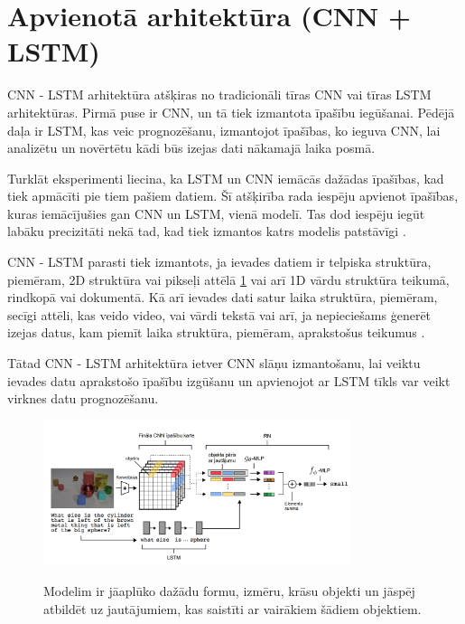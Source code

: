 \documentclass[12pt,paper=A4]{report}
\begin{document}
\section{Apvienotā arhitektūra (CNN + LSTM)}
CNN - LSTM arhitektūra atšķiras no tradicionāli tīras CNN vai tīras LSTM arhitektūras. Pirmā puse ir CNN, un tā tiek izmantota īpašību iegūšanai. Pēdējā daļa ir LSTM, kas veic prognozēšanu, izmantojot īpašības, ko ieguva CNN, lai analizētu un novērtētu kādi būs izejas dati nākamajā laika posmā.

Turklāt eksperimenti liecina, ka LSTM un CNN iemācās dažādas īpašības, kad tiek apmācīti pie tiem pašiem datiem. Šī atšķirība rada iespēju apvienot īpašības, kuras iemācījušies gan 
CNN un LSTM, vienā modelī. Tas dod iespēju iegūt labāku precizitāti nekā tad, kad tiek izmantos katrs modelis patstāvīgi \cite{geras2015blending}. 

 CNN - LSTM parasti tiek izmantots, ja ievades datiem ir telpiska struktūra, piemēram, 2D struktūra vai pikseļi attēlā \ref{cnnLstm} vai arī 1D vārdu struktūra teikumā, rindkopā vai dokumentā. Kā arī ievades dati satur laika struktūra, piemēram, secīgi attēli, kas veido video, vai vārdi tekstā vai arī, ja nepieciešams ģenerēt izejas datus, kam piemīt laika struktūra, piemēram, aprakstošus teikumus \cite{lstmCNNTut}. 
 
 Tātad CNN - LSTM arhitektūra ietver CNN slāņu izmantošanu, lai veiktu ievades datu aprakstošo īpašību izgūšanu un apvienojot ar LSTM tīkls var veikt virknes datu prognozēšanu.
 
 \begin{figure}[H] \centering
\includegraphics[width=0.80\textwidth]{cnnLstm} 
\caption{Modelim ir jāaplūko dažādu formu, izmēru, krāsu objekti un jāspēj atbildēt uz jautājumiem, kas saistīti ar vairākiem šādiem objektiem.} \cite{https://hackernoon.com/deepmind-relational-networks-demystified-b593e408b643}  \label{cnnLstm} 
\end{figure}
\end{document}

